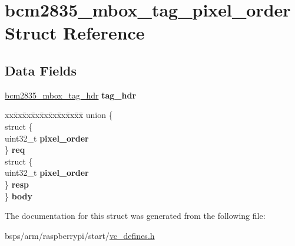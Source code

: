 \hypertarget{structbcm2835__mbox__tag__pixel__order}{}\section{bcm2835\+\_\+mbox\+\_\+tag\+\_\+pixel\+\_\+order Struct Reference}
\label{structbcm2835__mbox__tag__pixel__order}
\subsection*{Data Fields}
\begin{DoxyCompactItemize}
\item 
\mbox{\label{structbcm2835__mbox__tag__pixel__order_a8d90f03abdb8f4e8aab263bf95b93552}} 
\mbox{\hyperlink{structbcm2835__mbox__tag__hdr}{bcm2835\+\_\+mbox\+\_\+tag\+\_\+hdr}} {\bfseries tag\+\_\+hdr}
\item 
\mbox{\label{structbcm2835__mbox__tag__pixel__order_a3cf782974fe0a5c94add2e60d507383f}} 
\begin{tabbing}
xx\=xx\=xx\=xx\=xx\=xx\=xx\=xx\=xx\=\kill
union \{\\
\>struct \{\\
\>\>uint32\_t {\bfseries pixel\_order}\\
\>\} {\bfseries req}\\
\>struct \{\\
\>\>uint32\_t {\bfseries pixel\_order}\\
\>\} {\bfseries resp}\\
\} {\bfseries body}\\

\end{tabbing}\end{DoxyCompactItemize}


The documentation for this struct was generated from the following file\+:\begin{DoxyCompactItemize}
\item 
bsps/arm/raspberrypi/start/\mbox{\hyperlink{vc__defines_8h}{vc\+\_\+defines.\+h}}\end{DoxyCompactItemize}
